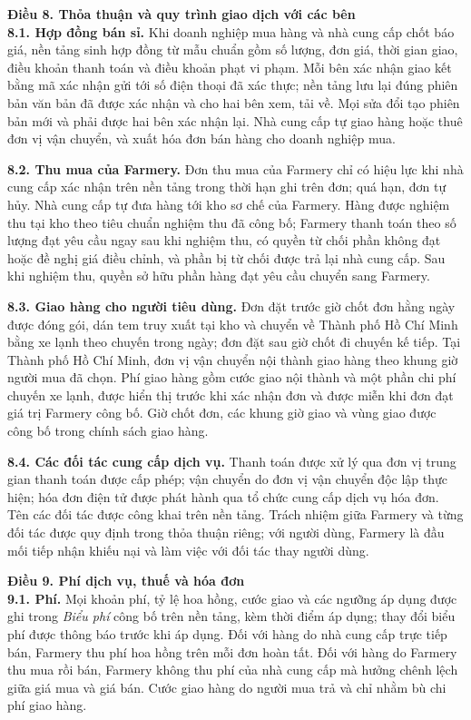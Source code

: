 \noindent\textbf{Điều 8. Thỏa thuận và quy trình giao dịch với các bên}\\
\textbf{8.1. Hợp đồng bán sỉ.} Khi doanh nghiệp mua hàng và nhà cung cấp chốt
báo giá, nền tảng sinh hợp đồng từ mẫu chuẩn gồm số lượng, đơn giá, thời gian
giao, điều khoản thanh toán và điều khoản phạt vi phạm. Mỗi bên xác nhận giao
kết bằng mã xác nhận gửi tới số điện thoại đã xác thực; nền tảng lưu lại đúng
phiên bản văn bản đã được xác nhận và cho hai bên xem, tải về. Mọi sửa đổi tạo
phiên bản mới và phải được hai bên xác nhận lại. Nhà cung cấp tự giao hàng
hoặc thuê đơn vị vận chuyển, và xuất hóa đơn bán hàng cho doanh nghiệp mua.

\textbf{8.2. Thu mua của Farmery.} Đơn thu mua của Farmery chỉ có hiệu lực khi
nhà cung cấp xác nhận trên nền tảng trong thời hạn ghi trên đơn; quá hạn, đơn
tự hủy. Nhà cung cấp tự đưa hàng tới kho sơ chế của Farmery. Hàng được nghiệm
thu tại kho theo tiêu chuẩn nghiệm thu đã công bố; Farmery thanh toán theo số
lượng đạt yêu cầu ngay sau khi nghiệm thu, có quyền từ chối phần không đạt
hoặc đề nghị giá điều chỉnh, và phần bị từ chối được trả lại nhà cung cấp. Sau
khi nghiệm thu, quyền sở hữu phần hàng đạt yêu cầu chuyển sang Farmery.

\textbf{8.3. Giao hàng cho người tiêu dùng.} Đơn đặt trước giờ chốt đơn hằng
ngày được đóng gói, dán tem truy xuất tại kho và chuyển về Thành phố Hồ Chí
Minh bằng xe lạnh theo chuyến trong ngày; đơn đặt sau giờ chốt đi chuyến kế
tiếp. Tại Thành phố Hồ Chí Minh, đơn vị vận chuyển nội thành giao hàng theo
khung giờ người mua đã chọn. Phí giao hàng gồm cước giao nội thành và một
phần chi phí chuyến xe lạnh, được hiển thị trước khi xác nhận đơn và được miễn
khi đơn đạt giá trị Farmery công bố. Giờ chốt đơn, các khung giờ giao và vùng
giao được công bố trong chính sách giao hàng.

\textbf{8.4. Các đối tác cung cấp dịch vụ.} Thanh toán được xử lý qua đơn vị
trung gian thanh toán được cấp phép; vận chuyển do đơn vị vận chuyển độc lập
thực hiện; hóa đơn điện tử được phát hành qua tổ chức cung cấp dịch vụ hóa
đơn. Tên các đối tác được công khai trên nền tảng. Trách nhiệm giữa Farmery và
từng đối tác được quy định trong thỏa thuận riêng; với người dùng, Farmery là
đầu mối tiếp nhận khiếu nại và làm việc với đối tác thay người dùng.

\noindent\textbf{Điều 9. Phí dịch vụ, thuế và hóa đơn}\\
\textbf{9.1. Phí.} Mọi khoản phí, tỷ lệ hoa hồng, cước giao và các ngưỡng áp
dụng được ghi trong \emph{Biểu phí} công bố trên nền tảng, kèm thời điểm áp
dụng; thay đổi biểu phí được thông báo trước khi áp dụng. Đối với hàng do
nhà cung cấp trực tiếp bán, Farmery thu phí hoa hồng trên mỗi đơn hoàn tất.
Đối với hàng do Farmery thu mua rồi bán, Farmery không thu phí của nhà cung
cấp mà hưởng chênh lệch giữa giá mua và giá bán. Cước giao hàng do người mua
trả và chỉ nhằm bù chi phí giao hàng.

